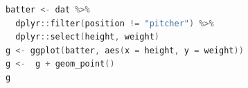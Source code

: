 \begin{lstlisting}[language=c++,label={code:11_02},caption={Initialization of the environment, installation of packages, and reading of files}]
batter <- dat %>%
  dplyr::filter(position != "pitcher") %>%
  dplyr::select(height, weight)
g <- ggplot(batter, aes(x = height, y = weight))
g <-  g + geom_point()
g
\end{lstlisting}
